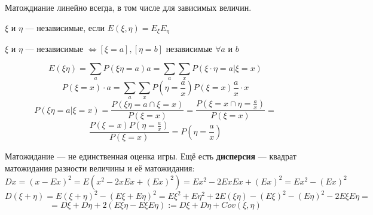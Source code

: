 Матождиание линейно всегда, в том числе для зависимых величин.

\begin{theorem}
    $\xi$ и $\eta$ --- независимые, если $E(\xi, \eta) = E_\xi E_\eta$
\end{theorem}
\begin{lemma}
    $\xi$ и $\eta$ --- независимые $\Leftrightarrow [\xi=a], [\eta=b]$ независимые $\forall a$ и $b$
\end{lemma}
$$E(\xi\eta)=\sum\limits_{a}P(\xi\eta=a)a=\sum\limits_{a}\sum\limits_{x} P(\xi\cdot\eta=a | \xi=x)$$
$$P(\xi=x)\cdot a=\sum\limits_{a}\sum\limits_{x} P\left(\eta=\frac{a}{x}\right)P(\xi=x)\frac{a}{x}\cdot x$$
$$P(\xi\eta=a | \xi=x)=\frac{P(\xi\eta=a\cap\xi=x)}{P(\xi=x)}=\frac{P(\xi=x\cap \eta=\frac{a}{x})}{P(\xi=x)}=$$
$$\frac{P(\xi=x)P(\eta=\frac{a}{x})}{P(\xi=x)}=P(\eta=\frac{a}{x})$$

Матожидание --- не единственная оценка игры. Ещё есть \textbf{дисперсия} --- квадрат матожидания разности величины и её матожидания:
$$Dx=(x-Ex)^2=E(x^2-2xEx+(Ex)^2)=Ex^2-2ExEx+(Ex)^2=Ex^2-(Ex)^2$$
$$D(\xi+\eta)=E(\xi+\eta)^2-(E\xi+E\eta)^2=E\xi^2+E\eta^2+2E(\xi\eta)-(E\xi)^2-(E\eta)^2-2E\xi E\eta=$$
$$=D\xi+D\eta+2(E\xi\eta - E\xi E\eta):=D\xi+D\eta+Cov(\xi, \eta)$$

